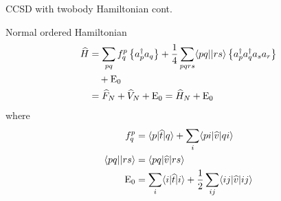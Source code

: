 \begin{frame}{CCSD with twobody Hamiltonian cont.}

    \begin{block}{Normal ordered Hamiltonian}
        \begin{align*}
            \widehat{H} &= \sum_{pq} f_q^p\left\{ a_p^\dagger a_q \right\} + 
                \frac{1}{4} \sum_{pqrs} \langle pq| |rs\rangle \left\{ a_p^\dagger a_q^\dagger a_s a_r \right\} \\
                & \quad + \mathrm{E}_0 \\
                &= \widehat{F}_N + \widehat{V}_N  + \mathrm{E}_0 
                = \widehat{H}_N  + \mathrm{E}_0
        \end{align*}
        where
        \begin{align*}
            f_q^p &= \langle p| \widehat{t} |q\rangle + \sum_i \langle pi| \widehat{v} |qi\rangle \\
            \langle pq| |rs\rangle &= \langle pq| \widehat{v} |rs\rangle \\
            \mathrm{E}_0 &= \sum_i \langle i| \widehat{t} |i\rangle + \frac{1}{2} \sum_{ij} \langle ij| \widehat{v} |ij\rangle
        \end{align*}
    \end{block}

\end{frame}

    
